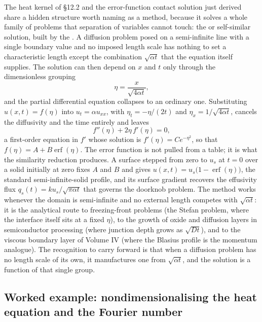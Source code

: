 \begin{mastery}
The heat kernel of §12.2 and the error-function contact solution
just derived share a hidden structure worth naming as a method,
because it solves a whole family of problems that separation of
variables cannot touch: the  or self-similar
solution, built by the . A
diffusion problem posed on a semi-infinite line with a single
boundary value and no imposed length scale has nothing to set a
characteristic length except the combination $\sqrt{\alpha t}$ that
the equation itself supplies. The solution can then depend on $x$ and
$t$ only through the dimensionless grouping
\[
\eta = \frac{x}{\sqrt{4\alpha t}},
\]
and the partial differential equation collapses to an ordinary one.
Substituting $u(x,t) = f(\eta)$ into $u_{t} = \alpha u_{xx}$, with
$\eta_{t} = -\eta/(2t)$ and $\eta_{x} = 1/\sqrt{4\alpha t}$, cancels
the diffusivity and the time entirely and leaves
\[
f''(\eta) + 2\eta\, f'(\eta) = 0,
\]
a first-order equation in $f'$ whose solution is $f'(\eta) = C
e^{-\eta^{2}}$, so that $f(\eta) = A + B\operatorname{erf}(\eta)$.
The error function is not pulled from a table; it is what the
similarity reduction produces. A surface stepped from zero to
$u_{s}$ at $t = 0$ over a solid initially at zero fixes $A$ and $B$
and gives $u(x,t) = u_{s}\bigl(1 - \operatorname{erf}(\eta)\bigr)$,
the standard semi-infinite-solid profile, and its surface gradient
recovers the effusivity flux $q_{s}(t) = k u_{s}/\sqrt{\pi\alpha t}$
that governs the doorknob problem. The method works whenever the
domain is semi-infinite and no external length competes with
$\sqrt{\alpha t}$: it is the analytical route to freezing-front
problems (the Stefan problem, where the interface itself sits at a
fixed $\eta$), to the growth of oxide and diffusion layers in
semiconductor processing (where junction depth grows as
$\sqrt{Dt}$), and to the viscous boundary layer of Volume IV (where
the Blasius profile is the momentum analogue). The recognition to
carry forward is that when a diffusion problem has no length scale
of its own, it manufactures one from $\sqrt{\alpha t}$, and the
solution is a function of that single group.
\end{mastery}

\subsection{Worked example: nondimensionalising the heat equation and the Fourier number}

